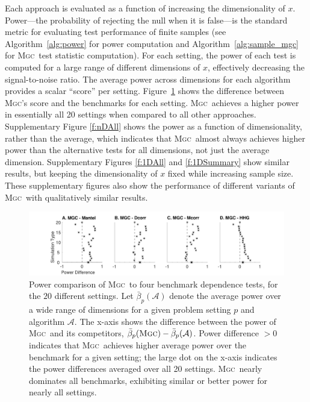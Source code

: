 \documentclass[11pt]{article}
\providecommand{\sct}[1]{{\normalfont\textsc{#1}}}
\providecommand{\mc}[1]{\mathcal{#1}}
\newcommand{\Mgc}{\sct{Mgc}}
\newcommand{\Dcorr}{\sct{Dcorr}}
\newcommand{\Mcorr}{\sct{Mcorr}}
\newcommand{\Mantel}{\sct{Mantel}}
\begin{document}
Each approach is evaluated as a function of increasing the dimensionality of $x$.  Power---the probability of rejecting the null when it is  false---is the standard metric for evaluating test performance of finite samples (see Algorithm~\ref{alg:power} for power computation and Algorithm~\ref{alg:sample_mgc} for \Mgc~test statistic computation).  
For each setting, the power of each test is computed for a large range of different dimensions of $x$,  effectively decreasing the signal-to-noise ratio.  
The average power across dimensions for each algorithm provides a scalar ``score'' per setting.  %
Figure~\ref{f:nDSummary} shows the difference between \Mgc's score and the benchmarks for each setting.  
\Mgc~achieves a higher power in essentially all 20 settings when compared to all other approaches.  
Supplementary Figure \ref{f:nDAll} shows the power as a function of dimensionality, rather than the average, which indicates that  \Mgc~almost always achieves higher power than the alternative tests for all dimensions, not just the average dimension.  
 Supplementary Figures \ref{f:1DAll} and \ref{f:1DSummary} show similar results,  but keeping the dimensionality of $x$ fixed while increasing sample size. These supplementary figures also show the performance of different variants of \Mgc~with qualitatively similar results.%



\begin{figure}
  \centering
  \includegraphics[width=1.0\textwidth,trim={3.5cm 0 3.5cm 0},clip]{Figures/FigHDPowerMGCM}
  \caption{Power comparison of  \Mgc~to four benchmark dependence tests, for the $20$ different settings.  
Let $\bar{\beta}_p(\mathcal{A})$ denote the average power over a wide range of dimensions for a given problem setting $p$ and algorithm $\mc{A}$. The x-axis shows the difference between the power of \Mgc~and its competitors,  $\bar{\beta}_p(\Mgc)-\bar{\beta}_p(\mathcal{A})$. Power difference $>0$ indicates that \Mgc~achieves higher average power over the benchmark for a given setting;
the large dot on the x-axis indicates the  power differences averaged over all 20 settings.
\Mgc~nearly dominates all benchmarks, exhibiting similar or better power for nearly all settings. 
}
\label{f:nDSummary}
\end{figure}
\end{document}
